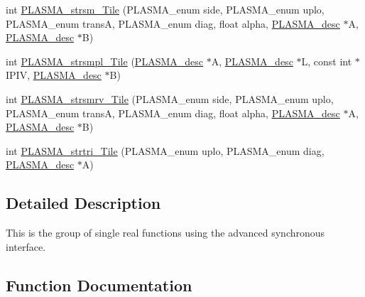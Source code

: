 \begin{DoxyCompactItemize}
\item 
int \hyperlink{group__float__Tile_ga0425cfe286874d53b29fe338b9affc12_ga0425cfe286874d53b29fe338b9affc12}{P\+L\+A\+S\+M\+A\+\_\+strsm\+\_\+\+Tile} (P\+L\+A\+S\+M\+A\+\_\+enum side, P\+L\+A\+S\+M\+A\+\_\+enum uplo, P\+L\+A\+S\+M\+A\+\_\+enum trans\+A, P\+L\+A\+S\+M\+A\+\_\+enum diag, float alpha, \hyperlink{structplasma__desc__t}{P\+L\+A\+S\+M\+A\+\_\+desc} $\ast$A, \hyperlink{structplasma__desc__t}{P\+L\+A\+S\+M\+A\+\_\+desc} $\ast$B)
\item 
int \hyperlink{group__float__Tile_ga776ea81e7a0a701390b918ae3ffe53b0_ga776ea81e7a0a701390b918ae3ffe53b0}{P\+L\+A\+S\+M\+A\+\_\+strsmpl\+\_\+\+Tile} (\hyperlink{structplasma__desc__t}{P\+L\+A\+S\+M\+A\+\_\+desc} $\ast$A, \hyperlink{structplasma__desc__t}{P\+L\+A\+S\+M\+A\+\_\+desc} $\ast$L, const int $\ast$I\+P\+I\+V, \hyperlink{structplasma__desc__t}{P\+L\+A\+S\+M\+A\+\_\+desc} $\ast$B)
\item 
int \hyperlink{group__float__Tile_ga197a6b89cd535edaa07c9deb1d583f2d_ga197a6b89cd535edaa07c9deb1d583f2d}{P\+L\+A\+S\+M\+A\+\_\+strsmrv\+\_\+\+Tile} (P\+L\+A\+S\+M\+A\+\_\+enum side, P\+L\+A\+S\+M\+A\+\_\+enum uplo, P\+L\+A\+S\+M\+A\+\_\+enum trans\+A, P\+L\+A\+S\+M\+A\+\_\+enum diag, float alpha, \hyperlink{structplasma__desc__t}{P\+L\+A\+S\+M\+A\+\_\+desc} $\ast$A, \hyperlink{structplasma__desc__t}{P\+L\+A\+S\+M\+A\+\_\+desc} $\ast$B)
\item 
int \hyperlink{group__float__Tile_ga8a53f6df17ef16abe97a991c737e82dc_ga8a53f6df17ef16abe97a991c737e82dc}{P\+L\+A\+S\+M\+A\+\_\+strtri\+\_\+\+Tile} (P\+L\+A\+S\+M\+A\+\_\+enum uplo, P\+L\+A\+S\+M\+A\+\_\+enum diag, \hyperlink{structplasma__desc__t}{P\+L\+A\+S\+M\+A\+\_\+desc} $\ast$A)
\end{DoxyCompactItemize}


\subsection{Detailed Description}
This is the group of single real functions using the advanced synchronous interface. 

\subsection{Function Documentation}
\hypertarget{group__float__Tile_ga87d12ba559572c6fe86af294f5cfb3a3_ga87d12ba559572c6fe86af294f5cfb3a3}{}
